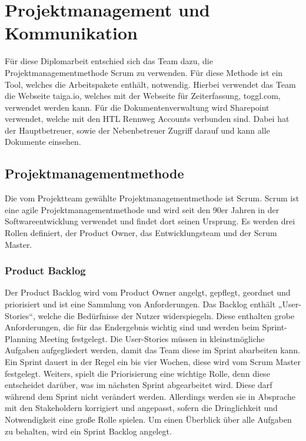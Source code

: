 \section{Projektmanagement und Kommunikation}

Für diese Diplomarbeit entschied sich das Team dazu, die Projektmanagementmethode Scrum zu verwenden. Für diese Methode ist ein Tool, welches die Arbeitspakete enthält, notwendig. Hierbei verwendet das Team die Webseite taiga.io, welches mit der Webseite für Zeiterfassung, toggl.com, verwendet werden kann. Für die Dokumentenverwaltung wird Sharepoint verwendet, welche mit den HTL Rennweg Accounts verbunden sind. Dabei hat der Hauptbetreuer, sowie der Nebenbetreuer Zugriff darauf und kann alle Dokumente einsehen.

\subsection{Projektmanagementmethode} 

Die vom Projektteam gewählte Projektmanagementmethode ist Scrum. Scrum ist eine agile Projektmanagementmethode und wird seit den 90er Jahren in der Softwareentwicklung verwendet und findet dort seinen Ursprung. Es werden drei Rollen definiert, der Product Owner, das Entwicklungsteam und der Scrum Master. \cite{scrum}

\subsubsection{Product Backlog} 
Der Product Backlog wird vom Product Owner angelgt, gepflegt, geordnet und priorisiert und ist eine Sammlung von Anforderungen. Das Backlog enthält „User-Stories“, welche die Bedürfnisse der Nutzer widerspiegeln. Diese enthalten grobe Anforderungen, die für das Endergebnis wichtig sind und werden beim Sprint-Planning Meeting festgelegt. Die User-Stories müssen in kleinstmögliche Aufgaben aufgegliedert werden, damit das Team diese im Sprint abarbeiten kann. Ein Sprint dauert in der Regel ein bis vier Wochen, diese wird vom Scrum Master festgelegt. Weiters, spielt die Priorisierung eine wichtige Rolle, denn diese entscheidet darüber, was im nächsten Sprint abgearbeitet wird. Diese darf während dem Sprint nicht verändert werden. Allerdings werden sie in Absprache mit den Stakeholdern korrigiert und angepasst, sofern die Dringlichkeit und Notwendigkeit eine große Rolle spielen. Um einen Überblick über alle Aufgaben zu behalten, wird ein Sprint Backlog angelegt. \cite{productbacklog}

